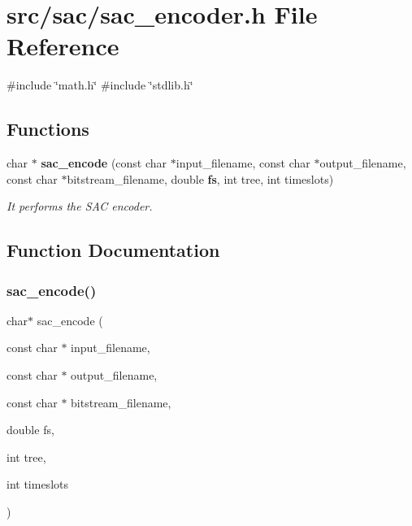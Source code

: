 \section{src/sac/sac\+\_\+encoder.h File Reference}
\label{sac__encoder_8h}
{\ttfamily \#include \char`\"{}math.\+h\char`\"{}}\newline
{\ttfamily \#include \char`\"{}stdlib.\+h\char`\"{}}\newline
\subsection*{Functions}
\begin{DoxyCompactItemize}
\item 
char $\ast$ \textbf{ sac\+\_\+encode} (const char $\ast$input\+\_\+filename, const char $\ast$output\+\_\+filename, const char $\ast$bitstream\+\_\+filename, double \textbf{ fs}, int tree, int timeslots)
\begin{DoxyCompactList}\small\item\em It performs the S\+AC encoder. \end{DoxyCompactList}\end{DoxyCompactItemize}


\subsection{Function Documentation}
\mbox{\label{sac__encoder_8h_aa7ad450f2c4d427f5b854a439d959d4d}} 
\subsubsection{sac\+\_\+encode()}
{\footnotesize\ttfamily char$\ast$ sac\+\_\+encode (\begin{DoxyParamCaption}\item[{const char $\ast$}]{input\+\_\+filename,  }\item[{const char $\ast$}]{output\+\_\+filename,  }\item[{const char $\ast$}]{bitstream\+\_\+filename,  }\item[{double}]{fs,  }\item[{int}]{tree,  }\item[{int}]{timeslots }\end{DoxyParamCaption})}



